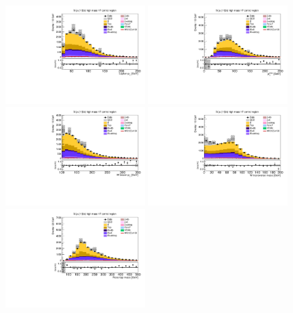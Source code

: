 \begin{figure}[tbp]
  \begin{center}
    \includegraphics[width=0.48\textwidth]{figures/wlnhbb2016/resolved/WmnWHHeavyFlavorCRHighMass_lepton1Pt.pdf}
    \includegraphics[width=0.48\textwidth]{figures/wlnhbb2016/resolved/WmnWHHeavyFlavorCRHighMass_pfmet.pdf}
    \includegraphics[width=0.48\textwidth]{figures/wlnhbb2016/resolved/WmnWHHeavyFlavorCRHighMass_WpT.pdf}
    \includegraphics[width=0.48\textwidth]{figures/wlnhbb2016/resolved/WmnWHHeavyFlavorCRHighMass_mTW.pdf}
    \includegraphics[width=0.48\textwidth]{figures/wlnhbb2016/resolved/WmnWHHeavyFlavorCRHighMass_topMassLep1Met.pdf}

\end{center}
\end{figure}
